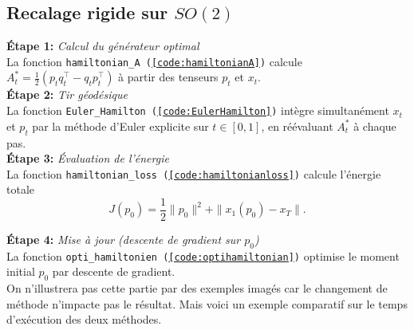 \documentclass[12pt]{report}
\begin{document}
\subsection{Recalage rigide sur \texorpdfstring{$SO(2)$}{SO (2)}}

\textbf{Étape 1:}\textit{ Calcul du générateur optimal}\\
La fonction \texttt{hamiltonian\_A~(\ref{code:hamiltonianA})} calcule $A^*_t=\frac12\left(p_t q_t^{\top}-q_t p_t^{\top}\right)$ à partir des tenseurs $p_t$ et $x_t$.\\

\textbf{Étape 2:}\textit{ Tir géodésique}\\
La fonction \texttt{Euler\_Hamilton~(\ref{code:EulerHamilton})} intègre simultanément $x_t$ et $p_t$ par la méthode d'Euler explicite sur $t\in[0,1]$, en réévaluant $A^*_t$ à chaque pas.\\

\textbf{Étape 3:}\textit{ Évaluation de l'énergie}\\
La fonction \texttt{hamiltonian\_loss~(\ref{code:hamiltonianloss})} calcule l'énergie totale 
\[
J(p_0)=\frac{1}{2}\|p_0\|^2+\|x_1(p_0)-x_T\|.
\]

\textbf{Étape 4:}\textit{ Mise à jour (descente de gradient sur $p_0$)}\\
La fonction \texttt{opti\_hamiltonien~(\ref{code:optihamiltonian})} optimise le moment initial $p_0$ par descente de gradient.\\

On n'illustrera pas cette partie par des exemples imagés car le changement de méthode n'impacte pas le résultat. Mais voici un exemple comparatif sur le temps d'exécution des deux méthodes.
\end{document}

